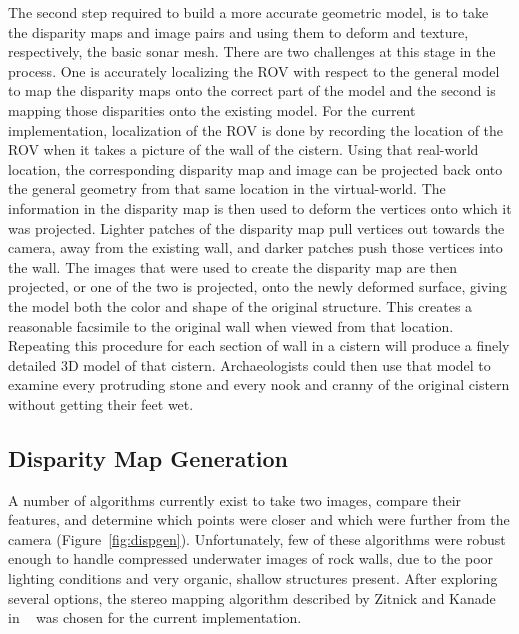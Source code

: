 \documentclass[a4paper,twoside]{article}
\begin{document}
The second step required to build a more accurate geometric model, is to take the disparity maps and image pairs and using them to deform and texture, respectively, the basic sonar mesh. There are two challenges at this stage in the process.  One is accurately localizing the ROV with respect to the general model to map the disparity maps onto the correct part of the model and the second is mapping those disparities onto the existing model.
For the current implementation, localization of the ROV is done by recording the location of the ROV when it takes a picture of the wall of the cistern.  
Using that real-world location, the corresponding disparity map and image can be projected back onto the general geometry from that same location in the virtual-world.
The information in the disparity map is then used to deform the vertices onto which it was projected.
Lighter patches of the disparity map pull vertices out towards the camera, away from the existing wall, and darker patches push those vertices into the wall.
The images that were used to create the disparity map are then projected, or one of the two is projected, onto the newly deformed surface, giving the model both the color and shape of the original structure.  
This creates a reasonable facsimile to the original wall when viewed from that location.  
Repeating this procedure for each section of wall in a cistern will produce a finely detailed 3D model of that cistern.  
Archaeologists could then use that model to examine every protruding stone and every nook and cranny of the original cistern without getting their feet wet.


\subsection{Disparity Map Generation}
\label{disparityMapGeneration}

\begin{figure*}[!ht]
   \vspace{-0.2cm}
   \caption{How we generate disparity maps from images.}
  \label{fig:dispgen}
 \end{figure*}


A number of algorithms currently exist to take two images, compare their features, and determine which points were closer and which were further from the camera (Figure~\ref{fig:dispgen}). 
Unfortunately, few of these algorithms were robust enough to handle compressed underwater images of rock walls, due to the poor lighting conditions and very organic, shallow structures present.
After exploring several options, the stereo mapping algorithm described by Zitnick and Kanade in ~\cite{stereo:zitKan} was chosen for the current implementation.
\end{document}
